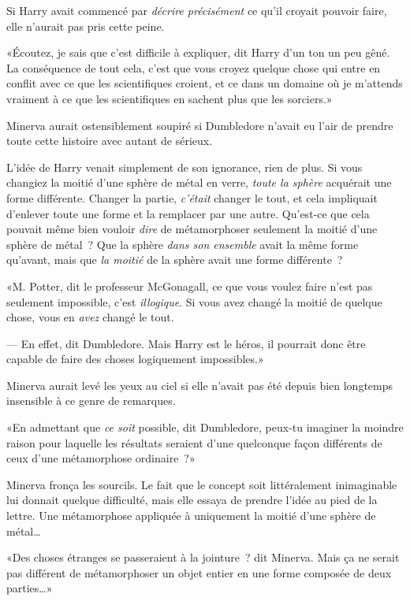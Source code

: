 Si Harry avait commencé par \emph{décrire précisément} ce qu'il croyait pouvoir faire, elle n'aurait pas pris cette peine.

«Écoutez, je sais que c'est difficile à expliquer, dit Harry d'un ton un peu gêné. La conséquence de tout cela, c'est que vous croyez quelque chose qui entre en conflit avec ce que les scientifiques croient, et ce dans un domaine où je m'attends vraiment à ce que les scientifiques en sachent plus que les sorciers.»

Minerva aurait ostensiblement soupiré si Dumbledore n'avait eu l'air de prendre toute cette histoire avec autant de sérieux.

L'idée de Harry venait simplement de son ignorance, rien de plus. Si vous changiez la moitié d'une sphère de métal en verre, \emph{toute la sphère} acquérait une forme différente. Changer la partie, \emph{c'était} changer le tout, et cela impliquait d'enlever toute une forme et la remplacer par une autre. Qu'est-ce que cela pouvait même bien vouloir \emph{dire} de métamorphoser seulement la moitié d'une sphère de métal~? Que la sphère \emph{dans son ensemble} avait la même forme qu'avant, mais que \emph{la moitié} de la sphère avait une forme différente~?

«M. Potter, dit le professeur McGonagall, ce que vous voulez faire n'est pas seulement impossible, c'est \emph{illogique}. Si vous avez changé la moitié de quelque chose, vous en \emph{avez} changé le tout.

--- En effet, dit Dumbledore. Mais Harry est le héros, il pourrait donc être capable de faire des choses logiquement impossibles.»

Minerva aurait levé les yeux au ciel si elle n'avait pas été depuis bien longtemps insensible à ce genre de remarques.

«En admettant que \emph{ce soit} possible, dit Dumbledore, peux-tu imaginer la moindre raison pour laquelle les résultats seraient d'une quelconque façon différents de ceux d'une métamorphose ordinaire~?»

Minerva fronça les sourcils. Le fait que le concept soit littéralement inimaginable lui donnait quelque difficulté, mais elle essaya de prendre l'idée au pied de la lettre. Une métamorphose appliquée à uniquement la moitié d'une sphère de métal…

«Des choses étranges se passeraient à la jointure~? dit Minerva. Mais ça ne serait pas différent de métamorphoser un objet entier en une forme composée de deux parties…»

